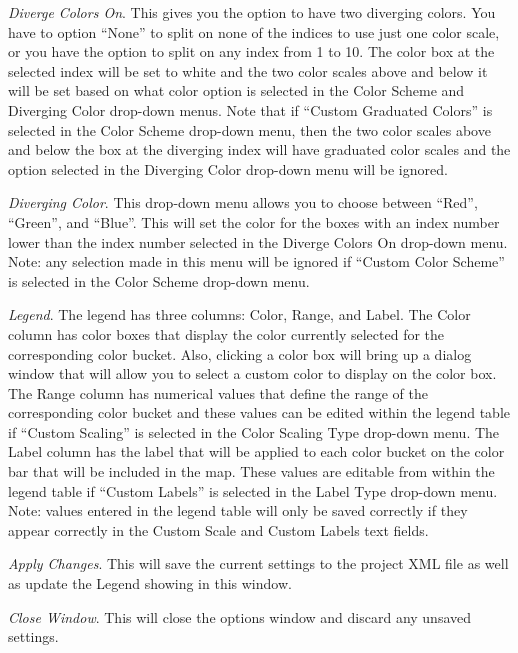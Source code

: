 \emph{Diverge Colors On}. 
This gives you the option to 
have two diverging colors. You have to option 
``None'' to split on none of the indices to use just one color scale, or 
you have the option to split on any index from 1 to 10. The color box at the 
selected index will be set to white and the two color scales above and 
below it will be set based on what color option is selected in the Color 
Scheme and Diverging Color drop-down menus. Note that if ``Custom Graduated Colors'' 
is selected in the Color Scheme drop-down menu, then the two color 
scales above and below the box at the diverging index will have graduated 
color scales and the option selected in the Diverging Color drop-down menu 
will be ignored.

\emph{Diverging Color}. 
This drop-down menu allows 
you to choose between ``Red'', ``Green'', and ``Blue''.  
This will set the color for the boxes with an index number lower than 
the index number selected in the Diverge Colors On drop-down menu.
Note: any selection made in this menu will be ignored if 
``Custom Color Scheme'' is selected in the Color Scheme drop-down menu.

\emph{Legend}. 
The legend has three columns: Color, Range, and Label. The 
Color column has color boxes that display the color currently selected for the 
corresponding color bucket. Also, clicking a color box will bring up a dialog 
window that will allow you to select a custom color to display on the color box. 
The Range column has numerical values that define the range of the corresponding 
color bucket and these values can be edited within the legend table if ``Custom Scaling'' is 
selected in the Color Scaling Type drop-down menu. The Label column has the label that 
will be applied to each color bucket on the color bar that will be included in the map. 
These values are editable from within the legend table if ``Custom Labels'' is selected 
in the Label Type drop-down menu. Note: values entered in the legend table will 
only be saved correctly if they appear correctly in the Custom Scale and Custom 
Labels text fields.

\emph{Apply Changes}. 
This will save the current settings to 
the project XML file as well as update the Legend showing in this window.

\emph{Close Window}. 
This will close the options window and discard any unsaved settings.


\clearpage
{}

